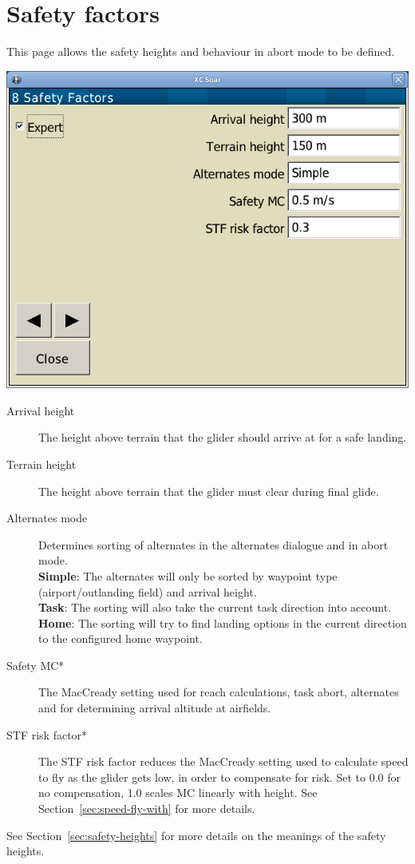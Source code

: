 \clearpage
\section{Safety factors}

This page allows the safety heights and behaviour in abort mode to be defined.

\begin{center}
\includegraphics[angle=0,width=0.8\linewidth,keepaspectratio='true']{figures/config-safety.png}
\end{center}

\begin{description}
\item[Arrival height]  The height above terrain that the glider
  should arrive at for a safe landing.
\item[Terrain height]  \label{conf:safetyterrain} The height above terrain that the glider must
  clear during final glide.
\item[Alternates mode]  \label{conf:alternatesmode} Determines sorting of alternates 
  in the alternates dialogue and in abort mode. \\
  {\bf Simple}: The alternates will only   be sorted by waypoint type 
  (airport/outlanding field) and arrival height. \\
  {\bf Task}: The sorting will also take the current task direction into account. \\
  {\bf Home}: The sorting will try to find landing options in the current direction 
  to the configured home waypoint.
\item[Safety MC*]  The MacCready setting used for reach calculations, task abort, alternates and
  for determining arrival altitude at airfields. 
\item[STF risk factor*] 
  The STF risk factor reduces the MacCready setting used to calculate
  speed to fly as the glider gets low, in order to compensate for
  risk.  Set to 0.0 for no compensation, 1.0 scales MC linearly with
  height.  See Section~\ref{sec:speed-fly-with} for more details.
\end{description}
See Section~\ref{sec:safety-heights} for more details on the meanings
of the safety heights.


